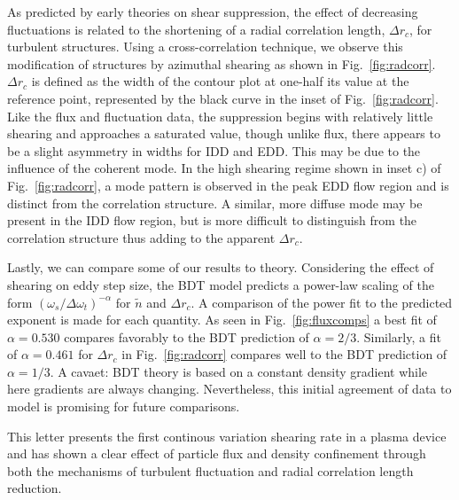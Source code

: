 \documentclass[aps,prl,amsmath,amssymb,preprint,superscriptaddress]{revtex4}
\begin{document}
As predicted by early theories on shear suppression, the effect of decreasing fluctuations is related to the shortening of a radial correlation length, $\Delta r_{c}$, for turbulent structures. Using a cross-correlation technique, we observe this modification of structures by azimuthal shearing as shown in Fig.~\ref{fig:radcorr}. $\Delta r_{c}$ is defined as the width of the contour plot at one-half its value at the reference point, represented by the black curve in the inset of Fig.~\ref{fig:radcorr}. Like the flux and fluctuation data, the suppression begins with relatively little shearing and approaches a saturated value, though unlike flux, there appears to be a slight asymmetry in widths for IDD and EDD. This may be due to the influence of the coherent mode. In the high shearing regime shown in inset c) of Fig.~\ref{fig:radcorr}, a mode pattern is observed in the peak EDD flow region and is distinct from the correlation structure. A similar, more diffuse mode may be present in the IDD flow region, but is more difficult to distinguish from the correlation structure thus adding to the apparent $\Delta r_{c}$.

Lastly, we can compare some of our results to theory. Considering the effect of shearing on eddy step size, the BDT model \cite{biglari90} predicts a power-law scaling of the form $\left(\omega_{s}/\Delta \omega_{t}\right)^{-\alpha}$ for $\tilde{n}$ and $\Delta r_{c}$. A comparison of the power fit to the predicted exponent is made for each quantity. As seen in Fig.~\ref{fig:fluxcomps} a best fit of $\alpha = 0.530$ compares favorably to the BDT prediction of $\alpha = 2/3$. Similarly, a fit of $\alpha = 0.461$ for $\Delta r_{c}$ in Fig.~\ref{fig:radcorr} compares well to the BDT prediction of $\alpha = 1/3$. A cavaet: BDT theory is based on a constant density gradient while here gradients are always changing. Nevertheless, this initial agreement of data to model is promising for future comparisons.



This letter presents the first continous variation shearing rate in a plasma device and has shown a clear effect of particle flux and density confinement through both the mechanisms of turbulent fluctuation and radial correlation length reduction.

\end{document}
